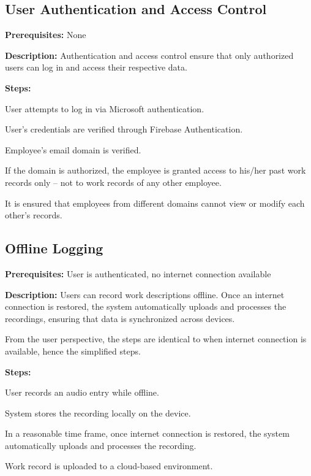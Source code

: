 \documentclass[
  digital,     %
  oneside,     %
  nosansbold,  %
  nocolorbold, %
  lof,         %
  lot,         %
]{fithesis4}
\begin{document}
\subsection{User Authentication and Access Control}

\noindent \textbf{Prerequisites:} None

\noindent \textbf{Description:}  
Authentication and access control ensure that only authorized users can log in and access their respective data.

\noindent \textbf{Steps:}
\begin{compactenum}
    \item User attempts to log in via Microsoft authentication.
    \item User's credentials are verified through Firebase Authentication.
    \item Employee's email domain is verified.
    \item If the domain is authorized, the employee is granted access to his/her past work records only – not to work records of any other employee.
    \item It is ensured that employees from different domains cannot view or modify each other's records.
\end{compactenum}

\subsection{Offline Logging}

\noindent \textbf{Prerequisites:} User is authenticated, no internet connection available

\noindent \textbf{Description:}  
Users can record work descriptions offline. Once an internet connection is restored, the system automatically uploads and processes the recordings, ensuring that data is synchronized across devices.

From the user perspective, the steps are identical to when internet connection is available, hence the simplified steps.

\noindent \textbf{Steps:}
\begin{compactenum}
    \item User records an audio entry while offline.
    \item System stores the recording locally on the device.
    \item In a reasonable time frame, once internet connection is restored, the system automatically uploads and processes the recording.
    \item Work record is uploaded to a cloud-based environment.
\end{compactenum}
\end{document}
